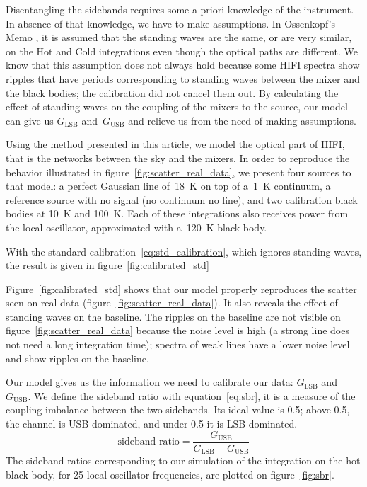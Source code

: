 \documentclass[journal]{IEEEtran}
\begin{document}
Disentangling the sidebands requires some a-priori knowledge of the instrument.
In absence of that knowledge, we have to make assumptions.
In Ossenkopf's Memo \cite{ossenkopf2002intensity}, it is assumed that the standing waves are the same, or are very similar, on the Hot and Cold integrations even though the optical paths are different.
We know that this assumption does not always hold because some HIFI spectra show ripples that have periods corresponding to standing waves between the mixer and the black bodies; the calibration did not cancel them out.
By calculating the effect of standing waves on the coupling of the mixers to the source, our model can give us $G_\text{LSB}$ and~$G_\text{USB}$ and relieve us from the need of making assumptions.

Using the method presented in this article, we model the optical part of HIFI, that is the networks between the sky and the mixers.
In order to reproduce the behavior illustrated in figure~\ref{fig:scatter_real_data}, we present four sources to that model: a perfect Gaussian line of~\SI{18}{\kelvin} on top of a~\SI{1}{\kelvin} continuum, a reference source with no signal (no continuum no line), and two calibration black bodies at \SI{10}{\kelvin} and \SI{100}{\kelvin}.
Each of these integrations also receives power from the local oscillator, approximated with a~\SI{120}{\kelvin} black body.

With the standard calibration~\eqref{eq:std_calibration}, which ignores standing waves, the result is given in figure~\ref{fig:calibrated_std}

Figure~\ref{fig:calibrated_std} shows that our model properly reproduces the scatter seen on real data (figure~\ref{fig:scatter_real_data}).
It also reveals the effect of standing waves on the baseline.
The ripples on the baseline are not visible on figure~\ref{fig:scatter_real_data} because the noise level is high (a strong line does not need a long integration time); spectra of weak lines have a lower noise level and show ripples on the baseline.

Our model gives us the information we need to calibrate our data: $G_\text{LSB}$ and $G_\text{USB}$.
We define the sideband ratio with equation~\eqref{eq:sbr}, it is a measure of the coupling imbalance between the two sidebands.
Its ideal value is 0.5; above 0.5, the channel is USB-dominated, and under 0.5 it is LSB-dominated.
\begin{equation}
    \text{sideband ratio}
    =
    \frac{G_\text{USB}}{G_\text{LSB} + G_\text{USB}}
    \label{eq:sbr}
\end{equation}
The sideband ratios corresponding to our simulation of the integration on the hot black body, for 25 local oscillator frequencies, are plotted on figure~\ref{fig:sbr}.
\end{document}
